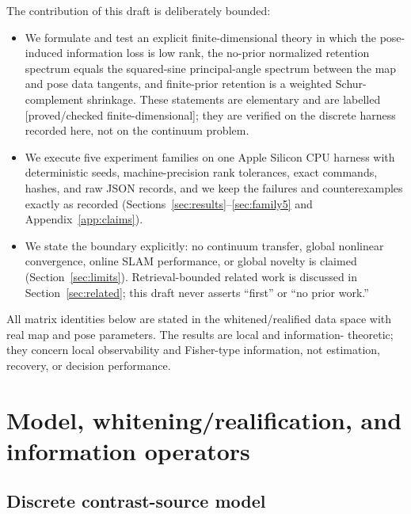 \documentclass[12pt]{article}
\newcommand{\FDL}{\textnormal{[proved/checked finite-dimensional]}}
\begin{document}
The contribution of this draft is deliberately bounded:
\begin{itemize}
\item We formulate and test an explicit finite-dimensional theory in which
the pose-induced information loss is low rank, the no-prior normalized
retention spectrum equals the squared-sine principal-angle spectrum between
the map and pose data tangents, and finite-prior retention is a weighted
Schur-complement shrinkage. These statements are elementary and are labelled
\FDL{}; they are verified on the discrete harness recorded here, not on the
continuum problem.
\item We execute five experiment families on one Apple Silicon CPU harness
with deterministic seeds, machine-precision rank tolerances, exact commands,
hashes, and raw JSON records, and we keep the failures and counterexamples
exactly as recorded (Sections~\ref{sec:results}--\ref{sec:family5} and
Appendix~\ref{app:claims}).
\item We state the boundary explicitly: no continuum transfer, global
nonlinear convergence, online SLAM performance, or global novelty is claimed
(Section~\ref{sec:limits}). Retrieval-bounded related work is discussed in
Section~\ref{sec:related}; this draft never asserts ``first'' or ``no prior
work.''
\end{itemize}

All matrix identities below are stated in the whitened/realified data space
with real map and pose parameters. The results are local and information-
theoretic; they concern local observability and Fisher-type information, not
estimation, recovery, or decision performance.

\section{Model, whitening/realification, and information operators}\label{sec:model}

\subsection{Discrete contrast-source model}
\end{document}

